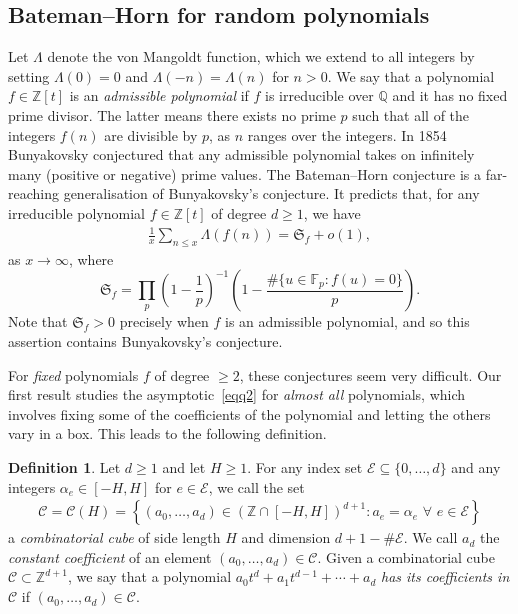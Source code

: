 \documentclass[11pt,letterpaper]{amsart}
\renewcommand{\leq}{\leqslant}
\renewcommand{\geq}{\geqslant}
\theoremstyle{definition}
\newtheorem{definition}[theorem]{Definition}
\numberwithin{equation}{section}
\newcommand{\0}{\mathbf{0}}
\begin{document}
\subsection{Bateman--Horn for random polynomials}

Let $\Lambda$ denote the von Mangoldt  function, which we extend to all integers by setting 
$\Lambda(0)=0$ and $\Lambda(-n)=\Lambda(n)$ for $n>0$.  We say that a polynomial $f\in \mathbb{Z}[t]$ is 
an \emph{admissible polynomial} 
if $f$ is irreducible over $\mathbb{Q}$ and it has no fixed prime divisor. The latter means there exists no prime $p$ such that all of the integers $f(n)$ are divisible by $p$, as $n$ ranges over the integers.   In 1854
Bunyakovsky conjectured that  any 
admissible  polynomial takes on infinitely many (positive or negative) prime values. The Bateman--Horn conjecture is a far-reaching generalisation of Bunyakovsky's conjecture. It predicts that, for any irreducible polynomial $f\in \mathbb{Z}[t]$ of degree $d\geq 1$, we have
\begin{align}\label{eqq2}
\frac{1}{x}\sum_{
n \leq x 
}\Lambda(f(n))=\mathfrak{S}_f+o(1),
\end{align}
as $x\to\infty$, 
where
$$
\mathfrak{S}_f=\prod_{p}\left(1-\frac{1}{p}\right)^{-1}
\left(1-
\frac{\#\{u\in \mathbb{F}_p: f(u)=0\}}{p}\right). 
$$
Note that $\mathfrak{S}_f>0$  precisely when $f$ is 
an admissible 
polynomial, and so this assertion 
contains Bunyakovsky's conjecture. 

For \emph{fixed} polynomials $f$ of degree $\geq 2$, these conjectures seem very difficult. Our first result  studies the asymptotic~\eqref{eqq2} for \emph{almost all} polynomials, which involves fixing some of the coefficients of the polynomial and letting the others vary in a box.  This leads to the following definition. 


\begin{definition}\label{def:cube}
Let $d\geq 1$ and let $H\geq 1$. For any index set $\mathcal{E}\subseteq \{0,\dots, d\}$ and any integers $\alpha_e\in [-H,H]$ for $e\in \mathcal{E}$, we call the set
\begin{align*}
\mathscr{C}=\mathscr{C}(H)= \left\{(a_0,\ldots, a_{d})\in (\mathbb{Z}\cap [-H,H])^{d+1}: a_e=\alpha_e\,\, \forall\,\, e\in \mathcal{E}\right\}  
\end{align*}
a \emph{combinatorial cube} of side length $H$ and dimension $d+1-\#\mathcal{E}$. We call $a_d$ the {\em constant coefficient} of an element  $(a_0,\ldots, a_{d})\in \mathscr{C}$.
Given a combinatorial cube $\mathscr{C}\subset \mathbb{Z}^{d+1}$, we say that a polynomial $a_0t^{d}+a_1t^{d-1}+\cdots +a_d$ \emph{has its coefficients in $\mathscr{C}$} if $(a_0,\ldots, a_d)\in \mathscr{C}$.
\end{definition}
\end{document}
